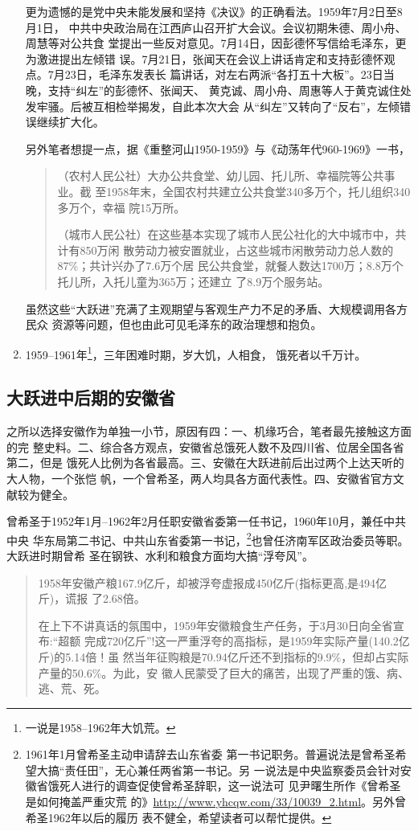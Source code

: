 \begin{enumerate}
  更为遗憾的是党中央未能发展和坚持《决议》的正确看法。1959年7月2日至8月1日，
  中共中央政治局在江西庐山召开扩大会议。会议初期朱德、周小舟、周慧等对公共食
  堂提出一些反对意见。7月14日，因彭德怀写信给毛泽东，更为激进提出左倾错
  误。7月21日，张闻天在会议上讲话肯定和支持彭德怀观点。7月23日，毛泽东发表长
  篇讲话，对左右两派“各打五十大板”。23日当晚，支持“纠左”的彭德怀、张闻天、
  黄克诚、周小舟、周惠等人于黄克诚住处发牢骚。后被互相检举揭发，自此本次大会
  从“纠左”又转向了“反右”，左倾错误继续扩大化。

  另外笔者想提一点，据《重整河山1950-1959》与《动荡年代960-1969》一书，
  \begin{quotation}
    （农村人民公社）大办公共食堂、幼儿园、托儿所、幸福院等公共事业。截
    至1958年末，全国农村共建立公共食堂340多万个，托儿组织340多万个，幸福
    院15万所。

    （城市人民公社）在这些基本实现了城市人民公社化的大中城市中，共计有850万闲
    散劳动力被安置就业，占这些城市闲散劳动力总人数的87\%；共计兴办了7.6万个居
    民公共食堂，就餐人数达1700万；8.8万个托儿所，入托儿童为365万；还建立
    了8.9万个服务站。
  \end{quotation}
  虽然这些“大跃进”充满了主观期望与客观生产力不足的矛盾、大规模调用各方民众
  资源等问题，但也由此可见毛泽东的政治理想和抱负。

\item 1959--1961年\footnote{一说是1958--1962年大饥荒。}，三年困难时期，岁大饥，人相食，
  饿死者以千万计。
\end{enumerate}

\subsection{大跃进中后期的安徽省}

之所以选择安徽作为单独一小节，原因有四：一、机缘巧合，笔者最先接触这方面的完
整史料。二、综合各方观点，安徽省总饿死人数不及四川省、位居全国各省第二，但是
饿死人比例为各省最高。三、安徽在大跃进前后出过两个上达天听的大人物，一个张恺
帆，一个曾希圣，两人均具各方面代表性。四、安徽省官方文献较为健全。

曾希圣于1952年1月--1962年2月任职安徽省委第一任书记，1960年10月，兼任中共中央
华东局第二书记、中共山东省委第一书记，\footnote{1961年1月曾希圣主动申请辞去山东省委
  第一书记职务。普遍说法是曾希圣希望大搞“责任田”，无心兼任两省第一书记。另
  一说法是中央监察委员会针对安徽省饿死人进行的调查促使曾希圣辞职，这一说法可
  见尹曙生所作《曾希圣是如何掩盖严重灾荒
  的》\url{http://www.yhcqw.com/33/10039_2.html}。另外曾希圣1962年以后的履历
  表不健全，希望读者可以帮忙提供。}也曾任济南军区政治委员等职。大跃进时期曾希
圣在钢铁、水利和粮食方面均大搞“浮夸风”。
\begin{quotation}
  1958年安徽产粮167.9亿斤，却被浮夸虚报成450亿斤(指标更高,是494亿斤)，谎报
  了2.68倍。\cite{zhangfandang}

  在上下不讲真话的氛围中，1959年安徽粮食生产任务，于3月30日向全省宣布:“超额
  完成720亿斤”!这一严重浮夸的高指标，是1959年实际产量(140.2亿斤)的5.14倍！虽
  然当年征购粮是70.94亿斤还不到指标的9.9\%，但却占实际产量的50.6\%。为此，安
  徽人民蒙受了巨大的痛苦，出现了严重的饿、病、逃、荒、死。\cite{zhang1959}
\end{quotation}

